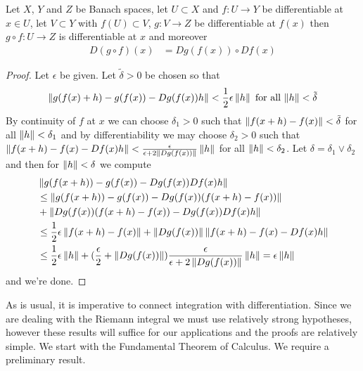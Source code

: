 \begin{prop}\label{ChainRuleBanachSpaces}Let $X$, $Y$ and $Z$ be
  Banach spaces, let $U \subset X$ and $f : U \to Y$ be differentiable
  at $x \in U$, let $V \subset Y$ with $f(U) \subset V$, $g : V \to Z$ be
  differentiable at $f(x)$ then $g \circ f : U \to Z$ is
  differentiable at $x$ and moreover
\begin{align*}
D(g \circ f)(x) &= Dg(f(x)) \circ Df(x)
\end{align*}
\end{prop}
\begin{proof}
Let $\epsilon$ be given.  Let $\tilde{\delta} > 0$ be chosen so that
\begin{align*}
  \left \lVert g(f(x) + h) - g(f(x)) - Dg(f(x)) h \right \rVert < \frac{1}{2} \epsilon  \left \lVert h \right \rVert \text{ for all $\left \lVert h \right \rVert < \tilde{\delta}$}
\end{align*}
By continuity of $f$
at $x$ we can choose $\delta_1>0$ such that $\left \lVert f(x+h) - f(x) \right \rVert <
\tilde{\delta}$ for all $\left \lVert h \right \rVert < \delta_1$ and by differentiability
we may choose $\delta_2>0$ such that $\left \lVert f(x+h) - f(x) - Df(x)h \right \rVert <
\frac{\epsilon}{\epsilon + 2\left \lVert Dg(f(x)) \right \rVert} \left \lVert h \right \rVert$ for all
$\left \lVert h \right \rVert < \delta_2$.  Let $\delta = \delta_1 \vee \delta_2$ and then
for $\left \lVert h \right \rVert < \delta$ we compute
\begin{align*}
&\left \lVert g(f(x+h)) - g(f(x)) - Dg(f(x)) Df(x) h \right \rVert \\
&\leq \left \lVert g(f(x+h)) -
                                                g(f(x)) - Dg(f(x))
                                                (f(x+h)-f(x))  \right \rVert  \\
&+\left \lVert Dg(f(x))(f(x+h)-f(x))
                                                - Dg(f(x)) Df(x) h \right \rVert\\
&\leq \frac{1}{2} \epsilon\left \lVert f(x+h)-f(x) \right \rVert  +\left \lVert Dg(f(x)) \right \rVert\left \lVert f(x+h)-f(x) - Df(x) h \right \rVert\\
&\leq \frac{1}{2} \epsilon \left \lVert h \right \rVert  +(\frac{\epsilon}{2} +
  \left \lVert Dg(f(x)) \right \rVert) \frac{\epsilon}{\epsilon + 2\left \lVert Dg(f(x)) \right \rVert}
  \left \lVert h \right \rVert = \epsilon \left \lVert h \right \rVert\\
\end{align*}
and we're done.
\end{proof}

As is usual, it is imperative to connect 
integration with differentiation.  Since we are dealing with the
Riemann integral we must use relatively strong hypotheses, however
these results will suffice for our applications and the proofs are relatively
simple.  We start with the Fundamental Theorem of Calculus.   We require a preliminary
result.

